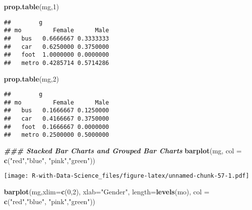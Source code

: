 \documentclass[
]{article}
\newenvironment{Shaded}{\begin{snugshade}}{\end{snugshade}}
\newcommand{\AttributeTok}[1]{\textcolor[rgb]{0.13,0.29,0.53}{#1}}
\newcommand{\DecValTok}[1]{\textcolor[rgb]{0.00,0.00,0.81}{#1}}
\newcommand{\DocumentationTok}[1]{\textcolor[rgb]{0.56,0.35,0.01}{\textbf{\textit{#1}}}}
\newcommand{\FunctionTok}[1]{\textcolor[rgb]{0.13,0.29,0.53}{\textbf{#1}}}
\newcommand{\NormalTok}[1]{#1}
\newcommand{\StringTok}[1]{\textcolor[rgb]{0.31,0.60,0.02}{#1}}
\begin{document}
\begin{Shaded}
\begin{Highlighting}[]
\FunctionTok{prop.table}\NormalTok{(mg,}\DecValTok{1}\NormalTok{)}
\end{Highlighting}
\end{Shaded}

\begin{verbatim}
##        g
## mo         Female      Male
##   bus   0.6666667 0.3333333
##   car   0.6250000 0.3750000
##   foot  1.0000000 0.0000000
##   metro 0.4285714 0.5714286
\end{verbatim}

\begin{Shaded}
\begin{Highlighting}[]
\FunctionTok{prop.table}\NormalTok{(mg,}\DecValTok{2}\NormalTok{)}
\end{Highlighting}
\end{Shaded}

\begin{verbatim}
##        g
## mo         Female      Male
##   bus   0.1666667 0.1250000
##   car   0.4166667 0.3750000
##   foot  0.1666667 0.0000000
##   metro 0.2500000 0.5000000
\end{verbatim}

\begin{Shaded}
\begin{Highlighting}[]
\DocumentationTok{\#\#\# Stacked Bar Charts and Grouped Bar Charts}
\FunctionTok{barplot}\NormalTok{(mg, }\AttributeTok{col =} \FunctionTok{c}\NormalTok{(}\StringTok{"red"}\NormalTok{,}\StringTok{"blue"}\NormalTok{, }\StringTok{"pink"}\NormalTok{,}\StringTok{"green"}\NormalTok{))}
\end{Highlighting}
\end{Shaded}

\texttt{[image: R-with-Data-Science\_files/figure-latex/unnamed-chunk-57-1.pdf]}

\begin{Shaded}
\begin{Highlighting}[]
\FunctionTok{barplot}\NormalTok{(mg,}\AttributeTok{xlim=}\FunctionTok{c}\NormalTok{(}\DecValTok{0}\NormalTok{,}\DecValTok{2}\NormalTok{), }\AttributeTok{xlab=}\StringTok{"Gender"}\NormalTok{, }\AttributeTok{length=}\FunctionTok{levels}\NormalTok{(mo), }\AttributeTok{col =} \FunctionTok{c}\NormalTok{(}\StringTok{"red"}\NormalTok{,}\StringTok{"blue"}\NormalTok{, }\StringTok{"pink"}\NormalTok{,}\StringTok{"green"}\NormalTok{))}
\end{Highlighting}
\end{Shaded}
\end{document}
